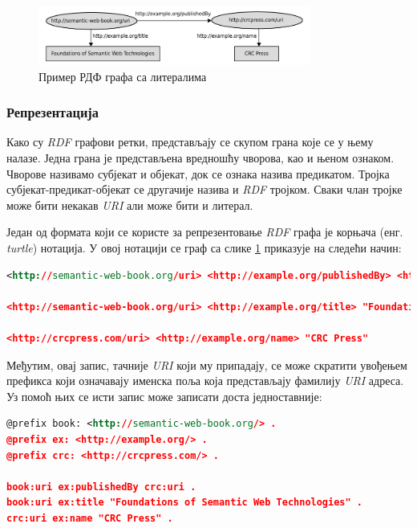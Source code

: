 \documentclass[12pt,oneside]{memoir}
\begin{document}
\begin{figure}[!ht]
  \centering
  \includegraphics[width=0.8\textwidth]{pictures/rdf_graph_example_2.png}
  \caption{Пример РДФ графа са литералима}
  \label{fig:semantic_rdf_graph_2}
\end{figure}

\subsubsection{Репрезентација}
\label{subsubsec:semantic_rdf_representation}

Како су \textit{RDF} графови ретки, представљају се скупом грана које се у њему налазе. Једна грана је представљена вредношћу чворова, као и њеном ознаком. Чворове називамо субјекат и објекат, док се ознака назива предикатом. Тројка субјекат-предикат-објекат се другачије назива и \textit{RDF} тројком. Сваки члан тројке може бити некакав \textit{URI} али може бити и литерал. \cite{semantic}

Један од формата који се користе за репрезентовање \textit{RDF} графа је корњача (енг. \textit{turtle}) нотација. У овој нотацији се граф са слике \ref{fig:semantic_rdf_graph_2} приказује на следећи начин:

\begin{lstlisting}[language=XML]
<http://semantic-web-book.org/uri> <http://example.org/publishedBy> <http://crcpress.com/uri> .
	
<http://semantic-web-book.org/uri> <http://example.org/title> "Foundations of Semantic Web Technologies" .

<http://crcpress.com/uri> <http://example.org/name> "CRC Press" 
\end{lstlisting}

Међутим, овај запис, тачније \textit{URI} који му припадају, се може скратити увођењем префикса који означавају именска поља која представљају фамилију \textit{URI} адреса. Уз помоћ њих се исти запис може записати доста једноставније:

\begin{lstlisting}[language=XML]
@prefix book: <http://semantic-web-book.org/> .
@prefix ex: <http://example.org/> .
@prefix crc: <http://crcpress.com/> .

book:uri ex:publishedBy crc:uri .
book:uri ex:title "Foundations of Semantic Web Technologies" .
crc:uri ex:name "CRC Press" .
\end{lstlisting}
\end{document}
